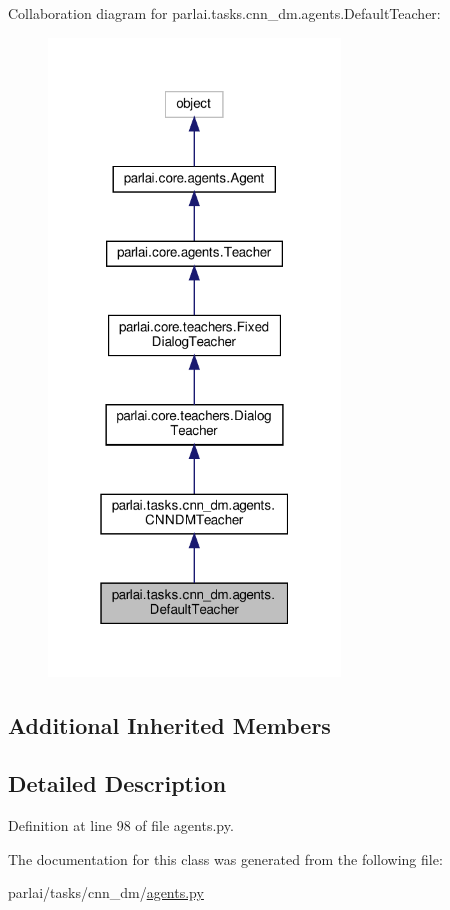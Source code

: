 Collaboration diagram for parlai.\+tasks.\+cnn\+\_\+dm.\+agents.\+Default\+Teacher\+:
\nopagebreak
\begin{figure}[H]
\begin{center}
\leavevmode
\includegraphics[width=220pt]{de/db5/classparlai_1_1tasks_1_1cnn__dm_1_1agents_1_1DefaultTeacher__coll__graph}
\end{center}
\end{figure}
\subsection*{Additional Inherited Members}


\subsection{Detailed Description}


Definition at line 98 of file agents.\+py.



The documentation for this class was generated from the following file\+:\begin{DoxyCompactItemize}
\item 
parlai/tasks/cnn\+\_\+dm/\hyperlink{parlai_2tasks_2cnn__dm_2agents_8py}{agents.\+py}\end{DoxyCompactItemize}
